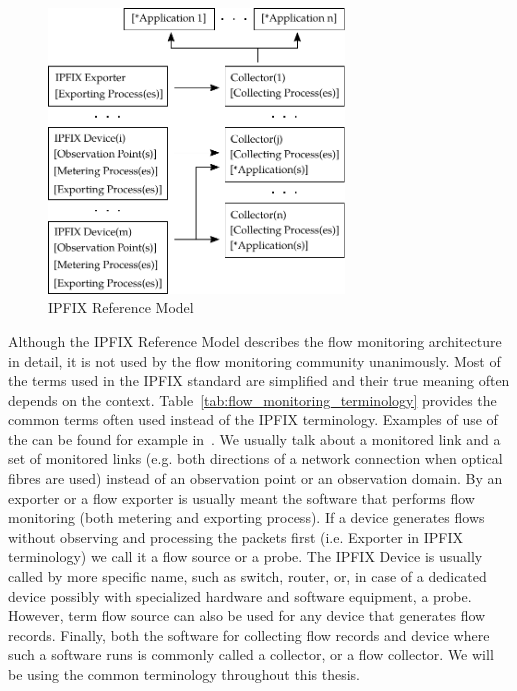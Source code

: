 \begin{figure}[t!]
  \begin{center}
    \includegraphics[width=0.7\textwidth]{figures/ipfix-reference-model}
  \end{center}
  \caption{IPFIX Reference Model~\cite{rfc5470}}
  \label{fig:ipfix_reference_model}
\end{figure}

Although the IPFIX Reference Model describes the flow monitoring architecture in detail, it is not used by the flow monitoring community unanimously. Most of the terms used in the IPFIX standard are simplified and their true meaning often depends on the context. Table~\ref{tab:flow_monitoring_terminology} provides the common terms often used instead of the IPFIX terminology. Examples of use of the  can be found for example in~\cite{Hofstede-2014-Flow, Cejka-2015-Using, Brownlee-2011-Flow, Krmicek-2009-Netflow, Lee-2007-End, Lee-2007-IPv6, Molina-2006-Design}. We usually talk about a monitored link and a set of monitored links (e.g. both directions of a network connection when optical fibres are used) instead of an observation point or an observation domain. By an exporter or a flow exporter is usually meant the software that performs flow monitoring (both metering and exporting process). If a device generates flows without observing and processing the packets first (i.e. Exporter in IPFIX terminology) we call it a flow source or a probe. The IPFIX Device is usually called by more specific name, such as switch, router, or, in case of a dedicated device possibly with specialized hardware and software equipment, a probe. However, term flow source can also be used for any device that generates flow records. Finally, both the software for collecting flow records and device where such a software runs is commonly called a collector, or a flow collector. We will be using the common terminology throughout this thesis.

